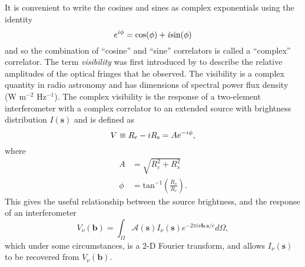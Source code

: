 It is convenient to write the cosines and sines as complex exponentials using the identity 
\begin{equation}
e^{i\phi} = \rm{cos}(\phi) + \mathit{i}\rm{sin}(\phi)
\end{equation}
and so the combination of ``cosine'' and ``sine'' correlators is called a ``complex'' correlator. The term \textit{visibility} was first introduced by \cite{michelson_1890} to describe the relative amplitudes of the optical fringes that he observed. The visibility is a complex quantity in radio astronomy and has dimensions of spectral power flux density (W m$^{-2}$ Hz$^{-1}$). The complex visibility is the response of a two-element interferometer with a complex correlator to an extended source with brightness distribution $I(\textbf{s})$  and is defined as
\begin{equation}
V\equiv R_{\rm{c}}-iR_{\rm{s}} = Ae^{-i\phi},
\end{equation}
where 
\begin{align}
        A&=\sqrt{R_{c}^2 + R_{s}^2}\\
    \phi &=\mathrm{tan}^{-1}\left(\frac{R_s}{R_c}\right).
\end{align}
This gives the useful relationship between the source brightness, and the response of an interferometer
\begin{equation}
V _{\nu}(\textbf{b}) = \int _{\Omega}\mathcal{A}(\textbf{s})I_{\nu}(\textbf{s})\mathit{e}^{-2\pi \mathit{i} \nu \textbf{b}.\textbf{s}/c}d\Omega ,
\label{eq:visib}
\end{equation}
which under some circumstances, is a 2-D Fourier transform, and allows $I_{\nu}(\textbf{s})$ to be recovered from $V _{\nu}(\textbf{b})$.
